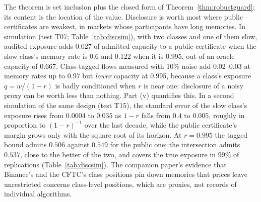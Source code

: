 \documentclass[12pt]{article}
\theoremstyle{definition}
\theoremstyle{remark}
\begin{document}
The theorem is set inclusion plus the closed form of Theorem~\ref{thm:robustguard}; its content is the location of the value. Disclosure is worth most where public certificates are weakest, in markets whose participants have long memories. In simulation (test T07; Table~\ref{tab:discsim}), with two classes and one of them slow, audited exposure adds 0.027 of admitted capacity to a public certificate when the slow class's memory rate is 0.6 and 0.122 when it is 0.995, out of an oracle capacity of 0.667. Class-tagged flows measured with 10\% noise add 0.02--0.03 at memory rates up to 0.97 but \emph{lower} capacity at 0.995, because a class's exposure $q=w/(1-r)$ is badly conditioned when $r$ is near one: disclosure of a noisy proxy can be worth less than nothing. Part (v) quantifies this. In a second simulation of the same design (test T15), the standard error of the slow class's exposure rises from $0.0004$ to $0.035$ as $1-r$ falls from $0.4$ to $0.005$, roughly in proportion to $(1-r)^{-1}$ over the last decade, while the public certificate's margin grows only with the square root of its horizon. At $r=0.995$ the tagged bound admits $0.506$ against $0.549$ for the public one; the intersection admits $0.537$, close to the better of the two, and covers the true exposure in 99\% of replications (Table~\ref{tab:discsim}). The companion paper's evidence that Binance's and the CFTC's class positions pin down memories that prices leave unrestricted concerns class-level positions, which are proxies, not records of individual algorithms.
\end{document}
